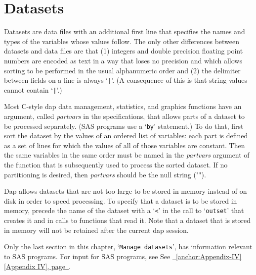 \documentclass{book}
\newcommand\Texinfocommandstyletextvar[1]{{\normalfont{}\textsl{#1}}}%
\renewcommand{\_}{\Texinfounderscore\discretionary{}{}{}}
\begin{document}
\chapter{{Datasets}}
\label{anchor:Datasets}%

Datasets
%
are data files with an additional first line that
specifies the names and types of the variables whose values follow.
The only other differences between datasets and data files are that
(1) integers and double precision floating point numbers are encoded
as text in a way that loses no precision and which allows sorting
to be performed in the usual alphanumeric order and (2) the delimiter
between fields on a line is always `\texttt{|}'.  (A consequence of this
is that string values
%
%
cannot contain `\texttt{|}'.)

%
%
%
Most C-style dap data management, statistics, and graphics functions
have an argument, called \Texinfocommandstyletextvar{partvars} in the specifications,
that allows parts of a dataset to be processed separately.
(SAS programs use a `\texttt{by}' statement.)
To do that, first sort the dataset by the values of an
ordered list of variables: each part is defined as a set of lines
for which the values of all of those variables are constant.
Then the same variables in the same order must be named in the \Texinfocommandstyletextvar{partvars} argument 
of the function that is subsequently used to process the sorted dataset. 
If no partitioning is desired, then \Texinfocommandstyletextvar{partvars} should be the null string ("").

Dap allows datasets
%
%
%
that are not too large to be stored in memory instead of on disk in order
to speed processing.
To specify that a dataset is to be stored in memory,
precede the name of the dataset with a `\texttt{<}'
in the call to `\texttt{outset}' that creates it and in calls to functions that read it.
Note that a dataset that is stored in memory will not be retained after the
current dap session.

Only the last section in this chapter, `\texttt{Manage datasets}', has information
relevant to SAS programs.
For input for SAS programs, see See \hyperref[anchor:Appendix-IV]{\chaptername~\ref*{anchor:Appendix-IV} [Appendix IV], page~\pageref*{anchor:Appendix-IV}}.
\end{document}
